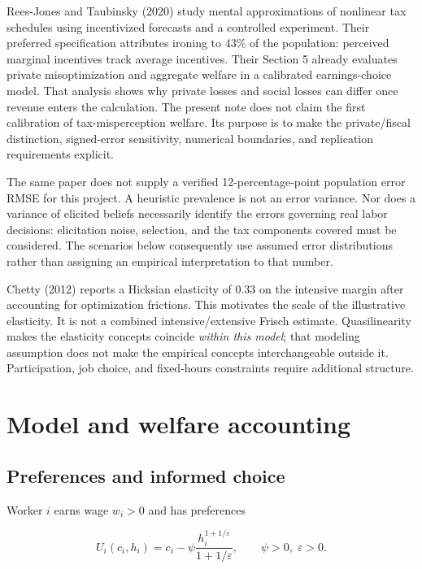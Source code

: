\documentclass[
  11pt,
  letterpaper,
  DIV=11,
  numbers=noendperiod]{scrartcl}
\begin{document}
Rees-Jones and Taubinsky (2020) study mental approximations of nonlinear
tax schedules using incentivized forecasts and a controlled experiment.
Their preferred specification attributes ironing to 43\% of the
population: perceived marginal incentives track average incentives.
Their Section 5 already evaluates private misoptimization and aggregate
welfare in a calibrated earnings-choice model. That analysis shows why
private losses and social losses can differ once revenue enters the
calculation. The present note does not claim the first calibration of
tax-misperception welfare. Its purpose is to make the private/fiscal
distinction, signed-error sensitivity, numerical boundaries, and
replication requirements explicit.

The same paper does not supply a verified 12-percentage-point population
error RMSE for this project. A heuristic prevalence is not an error
variance. Nor does a variance of elicited beliefs necessarily identify
the errors governing real labor decisions: elicitation noise, selection,
and the tax components covered must be considered. The scenarios below
consequently use assumed error distributions rather than assigning an
empirical interpretation to that number.

Chetty (2012) reports a Hicksian elasticity of 0.33 on the intensive
margin after accounting for optimization frictions. This motivates the
scale of the illustrative elasticity. It is not a combined
intensive/extensive Frisch estimate. Quasilinearity makes the elasticity
concepts coincide \emph{within this model}; that modeling assumption
does not make the empirical concepts interchangeable outside it.
Participation, job choice, and fixed-hours constraints require
additional structure.

\section{Model and welfare
accounting}\label{model-and-welfare-accounting}

\subsection{Preferences and informed
choice}\label{preferences-and-informed-choice}

Worker \(i\) earns wage \(w_i>0\) and has preferences

\[U_i(c_i,h_i)=c_i-\psi\frac{h_i^{1+1/\varepsilon}}{1+1/\varepsilon},\qquad \psi>0,\;\varepsilon>0.\]
\end{document}
